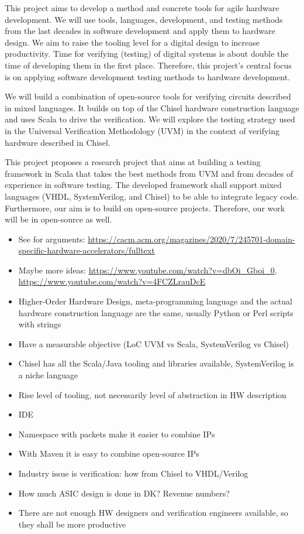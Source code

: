 \documentclass[fleqn,12pt]{article}
\begin{document}
This project aims to develop a method and concrete tools for agile hardware development.
We will use tools, languages, development, and testing methods from the last decades in
software development and apply them to hardware design.
We aim to raise the tooling level for a digital design to increase productivity.
Time for verifying (testing) of digital systems is about double the time of developing
them in the first place.
Therefore, this project's central focus is on applying software development
testing methods to hardware development.

We will build a combination of open-source tools for verifying
circuits described in mixed languages. It builds on top of the Chisel
hardware construction language and uses Scala to drive the verification. 
We will explore the testing strategy used in the Universal Verification Methodology
(UVM) in the context of verifying hardware described in Chisel.

This project proposes a research project that aims at building a testing framework
in Scala that takes the best methods from UVM and from decades of experience
in software testing.
The developed framework shall support mixed languages (VHDL, SystemVerilog, and Chisel)
to be able to integrate legacy code.
Furthermore, our aim is to build on open-source projects. Therefore, our
work will be in open-source as well.

\begin{itemize}
\item See for arguments: \url{https://cacm.acm.org/magazines/2020/7/245701-domain-specific-hardware-accelerators/fulltext}
\item Maybe more ideas: \url{https://www.youtube.com/watch?v=dbOi_Gboi_0}, \url{https://www.youtube.com/watch?v=4FCZLrauDcE}
\item Higher-Order Hardware Design, meta-programming language and the actual hardware construction language are the same, usually Python or Perl scripts with strings
\item Have a measurable objective (LoC UVM vs Scala, SystemVerilog vs Chisel)
\item Chisel has all the Scala/Java tooling and libraries available, SystemVerilog is a niche language
\item Rise level of tooling, not necessarily level of abstraction in HW description
\item IDE
\item Namespace with packets make it easier to combine IPs
\item With Maven it is easy to combine open-source IPs
\item Industry issue is verification: how from Chisel to VHDL/Verilog
\item How much ASIC design is done in DK? Revenue numbers?
\item There are not enough HW designers and verification engineers available, so they shall be more productive
\end{itemize}
\end{document}
